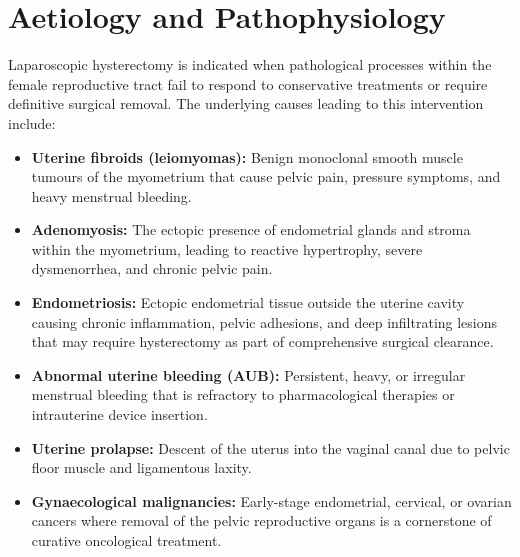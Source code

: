 \section*{Aetiology and Pathophysiology}
Laparoscopic hysterectomy is indicated when pathological processes within the female reproductive tract fail to respond to conservative treatments or require definitive surgical removal. The underlying causes leading to this intervention include:
\begin{itemize}
    \item \textbf{Uterine fibroids (leiomyomas):} Benign monoclonal smooth muscle tumours of the myometrium that cause pelvic pain, pressure symptoms, and heavy menstrual bleeding.
    \item \textbf{Adenomyosis:} The ectopic presence of endometrial glands and stroma within the myometrium, leading to reactive hypertrophy, severe dysmenorrhea, and chronic pelvic pain.
    \item \textbf{Endometriosis:} Ectopic endometrial tissue outside the uterine cavity causing chronic inflammation, pelvic adhesions, and deep infiltrating lesions that may require hysterectomy as part of comprehensive surgical clearance.
    \item \textbf{Abnormal uterine bleeding (AUB):} Persistent, heavy, or irregular menstrual bleeding that is refractory to pharmacological therapies or intrauterine device insertion.
    \item \textbf{Uterine prolapse:} Descent of the uterus into the vaginal canal due to pelvic floor muscle and ligamentous laxity.
    \item \textbf{Gynaecological malignancies:} Early-stage endometrial, cervical, or ovarian cancers where removal of the pelvic reproductive organs is a cornerstone of curative oncological treatment.
\end{itemize}

